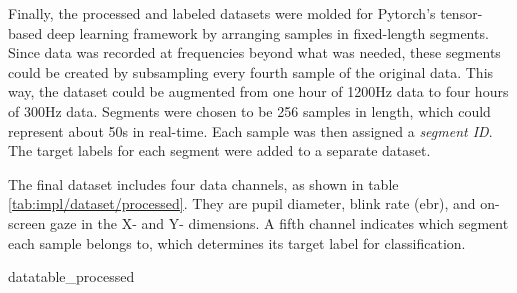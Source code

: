 Finally, the processed and labeled datasets were molded for Pytorch's tensor-based deep learning framework by arranging samples in fixed-length segments. Since data was recorded at frequencies beyond what was needed, these segments could be created by subsampling every fourth sample of the original data. This way, the dataset could be augmented from one hour of 1200Hz data to four hours of 300Hz data. Segments were chosen to be 256 samples in length, which could represent about 50s in real-time. Each sample was then assigned a \textit{segment ID}. The target labels for each segment were added to a separate dataset.

The final dataset includes four data channels, as shown in table \ref{tab:impl/dataset/processed}. They are pupil diameter, blink rate (\acrshort{ebr}), and on-screen gaze in the X- and Y- dimensions. A fifth channel indicates which segment each sample belongs to, which determines its target label for classification. 

{datatable_processed}



